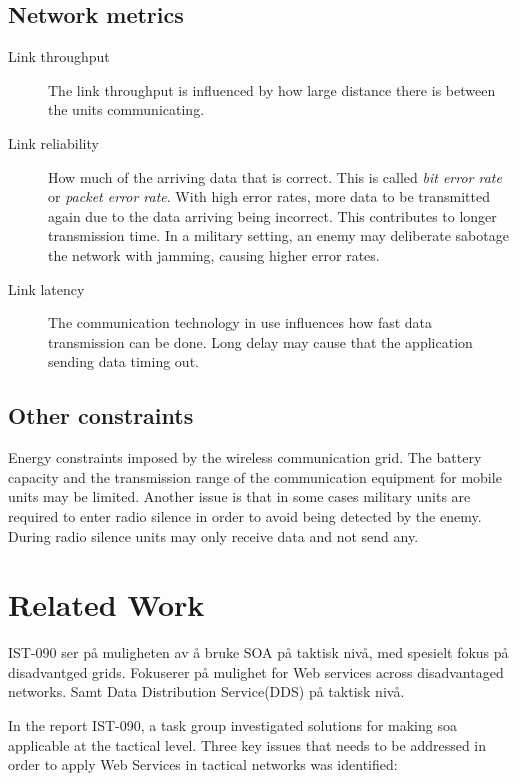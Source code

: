 \documentclass[USenglish]{ifimaster}
\begin{document}
\subsection{Network metrics}
\begin{description}

\item[Link throughput] The link throughput is influenced by how large distance
there is between the units communicating.

\item[Link reliability] How much of the arriving data that is correct. This is
called \textit{bit error rate} or \textit{packet error rate}. With high error
rates, more data to be transmitted again due to the data arriving being
incorrect. This contributes to longer transmission time. In a military setting,
an enemy may deliberate sabotage the network with jamming, causing higher error
rates.

\item[Link latency] The communication technology in use influences how fast data
transmission can be done. Long delay may cause that the application sending data
timing out.

\end{description}

\subsection{Other constraints}
Energy constraints imposed by the wireless communication grid. The battery
capacity and the transmission range of the communication equipment for mobile
units may be limited. Another issue is that in some cases military units are
required to enter radio silence in order to avoid being detected by the enemy.
During radio silence units may only receive data and not send any.


\section{Related Work}
IST-090 ser på muligheten av å bruke SOA på taktisk nivå, med spesielt fokus på
disadvantged grids. Fokuserer på mulighet for Web services across disadvantaged
networks. Samt Data Distribution Service(DDS) på taktisk nivå.

In the report IST-090, a task group investigated solutions for making \gls{soa}
applicable at the tactical level. Three key issues that needs to be addressed in
order to apply Web Services in tactical networks was
identified\cite{ist-118}\cite{ist-090}:
\end{document}
